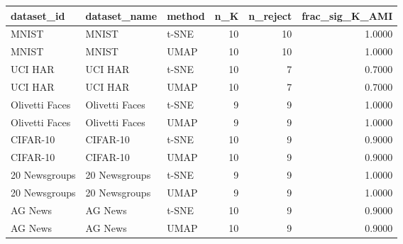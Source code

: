 \begin{tabular}{lllrrr}
\toprule
dataset_id & dataset_name & method & n_K & n_reject & frac_sig_K_AMI \\
\midrule
MNIST & MNIST & t-SNE & 10 & 10 & 1.0000 \\
MNIST & MNIST & UMAP & 10 & 10 & 1.0000 \\
UCI HAR & UCI HAR & t-SNE & 10 & 7 & 0.7000 \\
UCI HAR & UCI HAR & UMAP & 10 & 7 & 0.7000 \\
Olivetti Faces & Olivetti Faces & t-SNE & 9 & 9 & 1.0000 \\
Olivetti Faces & Olivetti Faces & UMAP & 9 & 9 & 1.0000 \\
CIFAR-10 & CIFAR-10 & t-SNE & 10 & 9 & 0.9000 \\
CIFAR-10 & CIFAR-10 & UMAP & 10 & 9 & 0.9000 \\
20 Newsgroups & 20 Newsgroups & t-SNE & 9 & 9 & 1.0000 \\
20 Newsgroups & 20 Newsgroups & UMAP & 9 & 9 & 1.0000 \\
AG News & AG News & t-SNE & 10 & 9 & 0.9000 \\
AG News & AG News & UMAP & 10 & 9 & 0.9000 \\
\bottomrule
\end{tabular}
